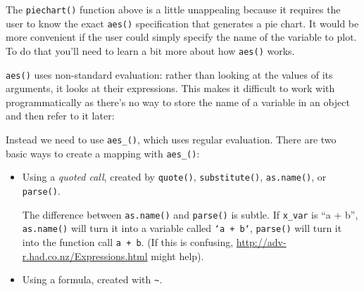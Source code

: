 The \texttt{piechart()} function above is a little unappealing because
it requires the user to know the exact \texttt{aes()} specification that
generates a pie chart. It would be more convenient if the user could
simply specify the name of the variable to plot. To do that you'll need
to learn a bit more about how \texttt{aes()} works.

\texttt{aes()} uses non-standard evaluation: rather than looking at the
values of its arguments, it looks at their expressions. This makes it
difficult to work with programmatically as there's no way to store the
name of a variable in an object and then refer to it later:

\begin{Shaded}
\begin{Highlighting}[]
\end{Highlighting}
\end{Shaded}

Instead we need to use \texttt{aes\_()}, which uses regular evaluation.
There are two basic ways to create a mapping with \texttt{aes\_()}:

\begin{itemize}
\item
  Using a \emph{quoted call}, created by \texttt{quote()},
  \texttt{substitute()}, \texttt{as.name()}, or \texttt{parse()}.
     

\begin{Shaded}
\begin{Highlighting}[]
\NormalTok{(}
\NormalTok{(}
\NormalTok{(}\NormalTok{(} \NormalTok{x_var)[[}\NormalTok{]])}

\StringTok{ }
  \NormalTok{(}
\NormalTok{\}}
\end{Highlighting}
\end{Shaded}

  The difference between \texttt{as.name()} and \texttt{parse()} is
  subtle. If \texttt{x\_var} is ``a + b'', \texttt{as.name()} will turn
  it into a variable called \texttt{`a\ +\ b`}, \texttt{parse()} will
  turn it into the function call \texttt{a\ +\ b}. (If this is
  confusing, \url{http://adv-r.had.co.nz/Expressions.html} might help).
\item
  Using a formula, created with \texttt{\textasciitilde{}}.
  \indexc{\textasciitilde}

\begin{Shaded}
\begin{Highlighting}[]
\end{Highlighting}
\end{Shaded}
\end{itemize}

